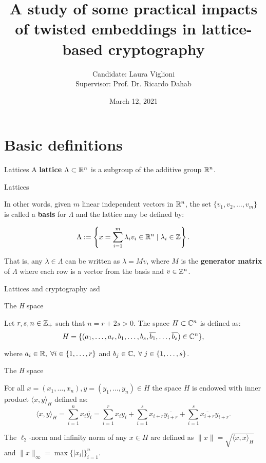 \documentclass[notheorems, bigger]{beamer}
\author{Candidate: Laura Viglioni \\ Supervisor: Prof. Dr. Ricardo Dahab}
\date{March 12, 2021}
\title{A study of some practical impacts of twisted embeddings in lattice-based cryptography}
\begin{document}
\maketitle

\section{Basic definitions}
\label{sec:org38c9e9f}
\begin{frame}[label={sec:orgda25001}]{Lattices}
A \textbf{lattice} \(\Lambda \subset \mathbb{R}^n\) is a subgroup of the additive group \(\mathbb{R}^n\).
\end{frame}
\begin{frame}[label={sec:orge674728}]{Lattices}
\begin{text}
  In other words, given $m$ linear independent vectors in $\mathbb{R}^n$, the set
  $\{v_1, v_2, ..., v_m\}$ is called a \textbf{basis} for $\Lambda$ and the lattice may be defined
  by:

  \begin{equation*}
    \Lambda := \left\{x = \sum_{i=1}^m{\lambda_iv_i} \in \mathbb{R}^n \; | \; \lambda_i \in \mathbb{Z}\right\}.
  \end{equation*}

  That is, any $\lambda \in \Lambda$ can be written as $\lambda = Mv$, where $M$ is the
  \textbf{generator matrix} of $\Lambda$ where each row is a vector from the basis and
  $v \in \mathbb{Z}^n$.
\end{text}
\end{frame}
\begin{frame}[label={sec:orge346c71}]{Lattices and cryptography}
asd
\end{frame}
\begin{frame}[label={sec:org2c93041}]{The \emph{H} space}
\begin{text}
  Let $r,s,n \in \mathbb{Z}_+$ such that $n = r + 2s > 0$. The space $H \subset \mathbb{C}^n$ is defined
  as:
  \begin{equation*}
    H = \{(a_1,\dots, a_r, b_1,\dots, b_s, \overline{b_1}, \dots, \overline{b_s}) \in \mathbb{C}^n\},
  \end{equation*}

  where $a_i \in \mathbb{R}, \; \forall i \in \{1,\dots,r\}$ and $b_j \in \mathbb{C}, \; \forall \; j \in \{1,\dots,
  s\}$.
\end{text}
\end{frame}
\begin{frame}[label={sec:org95a8ced}]{The \emph{H} space}
\begin{text}
  For all $x = \left(x_1, \dots, x_n\right), y = \left(y_1, \dots, y_n\right) \in H$ the space
  $H$ is endowed with inner product $\langle {x,y} \rangle_H$ defined as:
  \begin{equation*}
    \langle {x,y} \rangle_H = \sum_{i=1}^n{x_i \overline{y_i}} = \sum_{i=1}^r{x_i y_i} + \sum_{i=1}^s{x_{i+r} \overline{y_{i+r}}} + \sum_{i=1}^s{\overline{x_{i+r}} y_{i+r}}.
  \end{equation*}

  The $\ell_2$-norm and infinity norm of any $x \in H$ are defined as $\|x\| =
  \sqrt{\langle{x,x}\rangle_H}$ and $\|x\|_\infty = \max{\{ |x_i| \}}_{i=1}^n $.
\end{text}
\end{frame}
\end{document}
